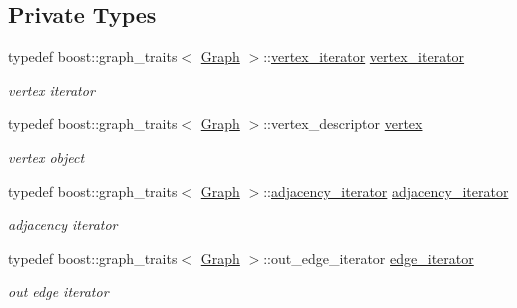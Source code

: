 \subsection*{Private Types}
\begin{DoxyCompactItemize}
\item 
typedef boost\+::graph\+\_\+traits$<$ \hyperlink{structGraph}{Graph} $>$\+::\hyperlink{classTTT__maximal__weighted__clique_ae7392a350cc8858253fe7908320daccd}{vertex\+\_\+iterator} \hyperlink{classTTT__maximal__weighted__clique_ae7392a350cc8858253fe7908320daccd}{vertex\+\_\+iterator}
\begin{DoxyCompactList}\small\item\em vertex iterator \end{DoxyCompactList}\item 
typedef boost\+::graph\+\_\+traits$<$ \hyperlink{structGraph}{Graph} $>$\+::vertex\+\_\+descriptor \hyperlink{classTTT__maximal__weighted__clique_ac6a30ba8fb726c9c83eafe9dc451a799}{vertex}
\begin{DoxyCompactList}\small\item\em vertex object \end{DoxyCompactList}\item 
typedef boost\+::graph\+\_\+traits$<$ \hyperlink{structGraph}{Graph} $>$\+::\hyperlink{classTTT__maximal__weighted__clique_ac24b6579a2e4fbd1d1531b782c0bff89}{adjacency\+\_\+iterator} \hyperlink{classTTT__maximal__weighted__clique_ac24b6579a2e4fbd1d1531b782c0bff89}{adjacency\+\_\+iterator}
\begin{DoxyCompactList}\small\item\em adjacency iterator \end{DoxyCompactList}\item 
typedef boost\+::graph\+\_\+traits$<$ \hyperlink{structGraph}{Graph} $>$\+::out\+\_\+edge\+\_\+iterator \hyperlink{classTTT__maximal__weighted__clique_ae1baef433523ffa0a91eecbee2b2edfc}{edge\+\_\+iterator}
\begin{DoxyCompactList}\small\item\em out edge iterator \end{DoxyCompactList}\end{DoxyCompactItemize}
